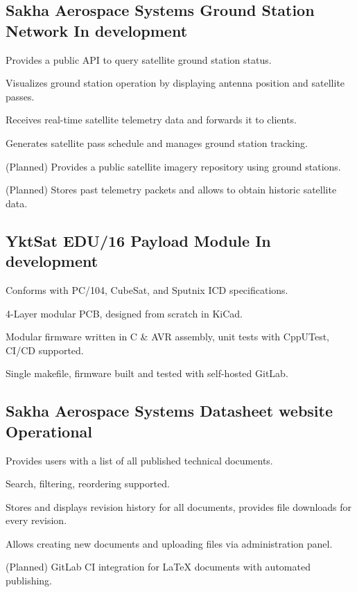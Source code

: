 \documentclass[letter,10pt]{article}
\begin{document}
\subsection{{Sakha Aerospace Systems Ground Station Network \hfill In development}}
\begin{zitemize}
\item Provides a public API to query satellite ground station status.
\item Visualizes ground station operation by displaying antenna position and satellite passes.
\item Receives real-time satellite telemetry data and forwards it to clients.
\item Generates satellite pass schedule and manages ground station tracking.
\item (Planned) Provides a public satellite imagery repository using ground stations.
\item (Planned) Stores past telemetry packets and allows to obtain historic satellite data.
\end{zitemize}

\subsection{{YktSat EDU/16 Payload Module \hfill In development}}
\begin{zitemize}
\item Conforms with PC/104, CubeSat, and Sputnix ICD specifications.
\item 4-Layer modular PCB, designed from scratch in KiCad.
\item Modular firmware written in C \& AVR assembly, unit tests with CppUTest, CI/CD supported.
\item Single makefile, firmware built and tested with self-hosted GitLab.
\end{zitemize}

\subsection{{Sakha Aerospace Systems Datasheet website \hfill Operational}}
\begin{zitemize}
\item Provides users with a list of all published technical documents.
\item Search, filtering, reordering supported.
\item Stores and displays revision history for all documents, provides file downloads for every revision.
\item Allows creating new documents and uploading files via administration panel.
\item (Planned) GitLab CI integration for {\LaTeX} documents with automated publishing.
\end{zitemize}
\end{document}
